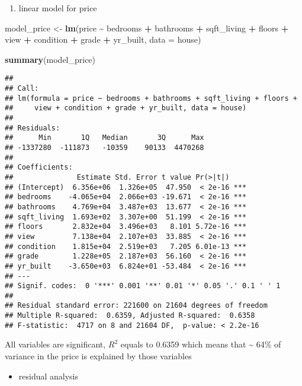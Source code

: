 \documentclass[
]{article}
\newenvironment{Shaded}{\begin{snugshade}}{\end{snugshade}}
\newcommand{\AttributeTok}[1]{\textcolor[rgb]{0.13,0.29,0.53}{#1}}
\newcommand{\FunctionTok}[1]{\textcolor[rgb]{0.13,0.29,0.53}{\textbf{#1}}}
\newcommand{\NormalTok}[1]{#1}
\newcommand{\OtherTok}[1]{\textcolor[rgb]{0.56,0.35,0.01}{#1}}
\newcommand{\SpecialCharTok}[1]{\textcolor[rgb]{0.81,0.36,0.00}{\textbf{#1}}}
\providecommand{\tightlist}{%
  \setlength{\itemsep}{0pt}\setlength{\parskip}{0pt}}
\begin{document}
\begin{enumerate}
\def\labelenumi{\alph{enumi}.}
\tightlist
\item
  linear model for price
\end{enumerate}

\begin{Shaded}
\begin{Highlighting}[]
\NormalTok{model\_price }\OtherTok{\textless{}{-}} \FunctionTok{lm}\NormalTok{(price }\SpecialCharTok{\textasciitilde{}}\NormalTok{ bedrooms }\SpecialCharTok{+}\NormalTok{ bathrooms }\SpecialCharTok{+}\NormalTok{ sqft\_living }\SpecialCharTok{+}
\NormalTok{  floors }\SpecialCharTok{+}\NormalTok{ view }\SpecialCharTok{+}\NormalTok{ condition }\SpecialCharTok{+}\NormalTok{ grade }\SpecialCharTok{+}\NormalTok{ yr\_built,}
  \AttributeTok{data =}\NormalTok{ house)}

\FunctionTok{summary}\NormalTok{(model\_price)}
\end{Highlighting}
\end{Shaded}

\begin{verbatim}
## 
## Call:
## lm(formula = price ~ bedrooms + bathrooms + sqft_living + floors + 
##     view + condition + grade + yr_built, data = house)
## 
## Residuals:
##      Min       1Q   Median       3Q      Max 
## -1337280  -111873   -10359    90133  4470268 
## 
## Coefficients:
##               Estimate Std. Error t value Pr(>|t|)    
## (Intercept)  6.356e+06  1.326e+05  47.950  < 2e-16 ***
## bedrooms    -4.065e+04  2.066e+03 -19.671  < 2e-16 ***
## bathrooms    4.769e+04  3.487e+03  13.677  < 2e-16 ***
## sqft_living  1.693e+02  3.307e+00  51.199  < 2e-16 ***
## floors       2.832e+04  3.496e+03   8.101 5.72e-16 ***
## view         7.138e+04  2.107e+03  33.885  < 2e-16 ***
## condition    1.815e+04  2.519e+03   7.205 6.01e-13 ***
## grade        1.228e+05  2.187e+03  56.160  < 2e-16 ***
## yr_built    -3.650e+03  6.824e+01 -53.484  < 2e-16 ***
## ---
## Signif. codes:  0 '***' 0.001 '**' 0.01 '*' 0.05 '.' 0.1 ' ' 1
## 
## Residual standard error: 221600 on 21604 degrees of freedom
## Multiple R-squared:  0.6359, Adjusted R-squared:  0.6358 
## F-statistic:  4717 on 8 and 21604 DF,  p-value: < 2.2e-16
\end{verbatim}

All variables are significant, \(R^2\) equals to 0.6359 which means that
\textasciitilde{} 64\% of variance in the price is explained by those
variables

\begin{itemize}
\tightlist
\item
  residual analysis
\end{itemize}
\end{document}
